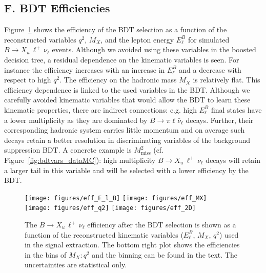 \documentclass[twocolumn,aps,prd,superscriptaddress,nofootinbib,floatfix,preprintnumbers,a4]{revtex4-1}
\newcommand{\bulnu}{\ensuremath{B \to X_u \, \ell^+\, \nu_{\ell}}\xspace}
\begin{document}
\begin{appendix}
\section*{F. BDT Efficiencies}

Figure~\ref{fig:effvars} shows the efficiency of the BDT selection as a function of the reconstructed variables $q^2$, $M_{X}$, and the lepton energy $E_\ell^B$ for simulated \bulnu events. Although we avoided using these variables in the boosted decision tree, a residual dependence on the kinematic variables is seen. For instance the efficiency increases with an increase in $E_\ell^B$ and a decrease with respect to high $q^2$. The efficiency on the hadronic mass $M_X$ is relatively flat. This efficiency dependence is linked to the used variables in the BDT. Although we carefully avoided kinematic variables that would allow the BDT to learn these kinematic properties, there are indirect connections: e.g. high $E_\ell^B$ final states have a lower multiplicity as they are dominated by $B \to \pi \ell \bar \nu_\ell$ decays. Further, their corresponding hadronic system carries little momentum and on average such decays retain a better resolution in discriminating variables of the background suppression BDT. A concrete example is $M_{\mathrm{miss}}^2$ (cf. Figure~\ref{fig:bdtvars_dataMC}): high multiplicity \bulnu decays will retain a larger tail in this variable and will be selected with a lower efficiency by the BDT. 

\begin{figure}[h!]
  \texttt{[image: figures/eff\_E\_l\_B]}  
  \texttt{[image: figures/eff\_MX]}  \\
  \texttt{[image: figures/eff\_q2]}  
  \texttt{[image: figures/eff\_2D]} 
\caption{
  The \bulnu efficiency after the BDT selection is shown as a function of the reconstructed kinematic variables ($E_\ell^B$, $M_X$, $q^2$) used in the signal extraction. The bottom right plot shows the efficiencies in the bins of $M_{X}:q^2$ and the binning can be found in the text. The uncertainties are statistical only.
 }
\label{fig:effvars}
\end{figure}


\end{appendix}
\end{document}
